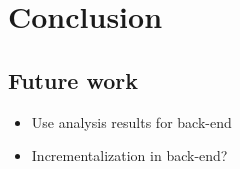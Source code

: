 
\chapter{\label{chap:conclusion}Conclusion}

  \section{\label{sec:future-work}Future work}

    \begin{itemize}
      \item Use analysis results for back-end
      \item Incrementalization in back-end?
    \end{itemize}
